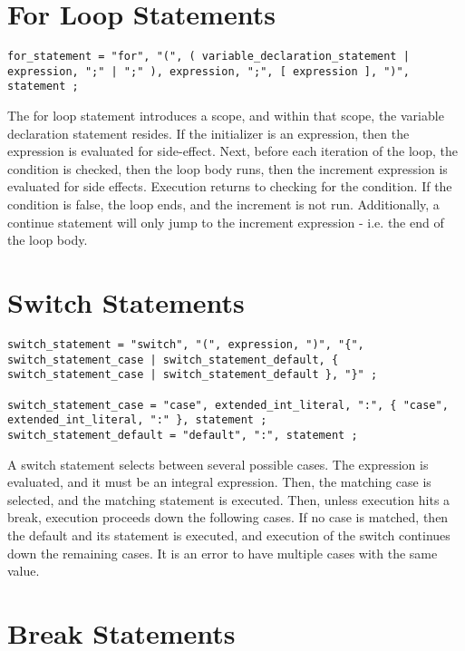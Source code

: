 \documentclass[letterpaper,12pt]{book}
\begin{document}
\section{For Loop Statements}

\begin{lstlisting}[breaklines=true]
for_statement = "for", "(", ( variable_declaration_statement | expression, ";" | ";" ), expression, ";", [ expression ], ")", statement ;
\end{lstlisting}

The for loop statement introduces a scope, and within that scope, the variable declaration statement resides. If the initializer is an expression, then the expression is evaluated for side-effect. Next, before each iteration of the loop, the condition is checked, then the loop body runs, then the increment expression is evaluated for side effects. Execution returns to checking for the condition. If the condition is false, the loop ends, and the increment is not run. Additionally, a continue statement will only jump to the increment expression - i.e. the end of the loop body.

\section{Switch Statements}

\begin{lstlisting}[breaklines=true]
switch_statement = "switch", "(", expression, ")", "{", switch_statement_case | switch_statement_default, { switch_statement_case | switch_statement_default }, "}" ;

switch_statement_case = "case", extended_int_literal, ":", { "case", extended_int_literal, ":" }, statement ;
switch_statement_default = "default", ":", statement ;
\end{lstlisting}

A switch statement selects between several possible cases. The expression is evaluated, and it must be an integral expression. Then, the matching case is selected, and the matching statement is executed. Then, unless execution hits a break, execution proceeds down the following cases. If no case is matched, then the default and its statement is executed, and execution of the switch continues down the remaining cases. It is an error to have multiple cases with the same value.

\section{Break Statements}
\end{document}
